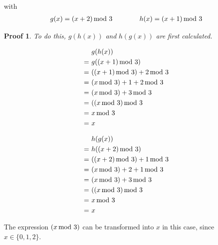 \documentclass[12pt,a4paper]{article}
\theoremstyle{custom}
\newtheorem*{proofcustom}{Proof}
\begin{document}
with
\begin{align*}
g(x)=(x + 2) \hspace*{-0.5em} \mod 3 \ \ \ \ \ \ \ \ \ \ \ \ h(x) = (x+1) \hspace*{-0.5em} \mod 3 
\end{align*}
\begin{proofcustom}
To do this, $g(h(x))$ and $h(g(x))$ are first calculated.

      \begin{align*}
		 & g(h(x)) \\
		= \ & g((x+1) \hspace*{-0.5em} \mod 3) \\
		= \ & ((x+1) \hspace*{-0.5em} \mod 3) +2 \hspace*{-0.5em} \mod 3  \\
		= \ & (x \hspace*{-0.5em} \mod 3) +1 +2 \hspace*{-0.5em} \mod 3  \\
		= \ & (x \hspace*{-0.5em} \mod 3) +3 \hspace*{-0.5em} \mod 3  \\
		= \ & ((x \hspace*{-0.5em} \mod 3) \hspace*{-0.5em} \mod 3  \\
		= \ & x \hspace*{-0.5em} \mod 3 \\
		= \ & x \\
	\end{align*}


      \begin{align*}
		 & h(g(x)) \\
		= \ & h((x+2) \hspace*{-0.5em} \mod 3) \\
		= \ & ((x+2) \hspace*{-0.5em} \mod 3) +1 \hspace*{-0.5em} \mod 3  \\
		= \ & (x \hspace*{-0.5em} \mod 3) +2 +1 \hspace*{-0.5em} \mod 3  \\
		= \ & (x \hspace*{-0.5em} \mod 3) +3 \hspace*{-0.5em} \mod 3  \\
		= \ & ((x \hspace*{-0.5em} \mod 3) \hspace*{-0.5em} \mod 3  \\
		= \ & x \hspace*{-0.5em} \mod 3 \\
		= \ & x \\
	\end{align*}
\end{proofcustom}
The expression $(x \hspace*{-0.5em} \mod 3)$ can be transformed into $x$ in this case, since $x \in \{0,1,2\}$.
\end{document}
